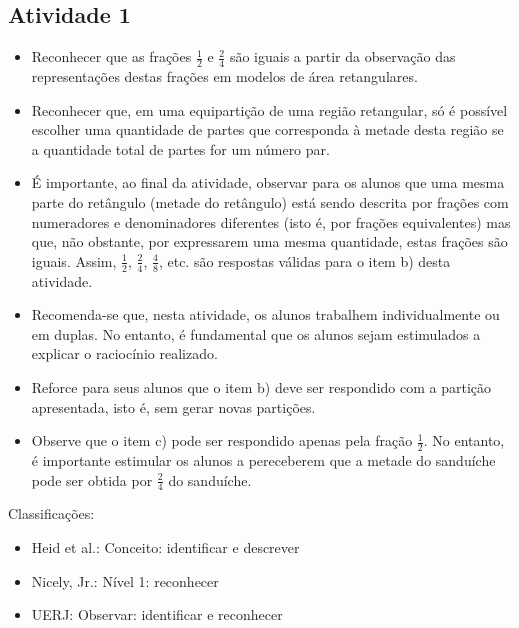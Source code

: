 \begin{multicols}{2}



\subsection{Atividade 1}

\begin{itemize} %
    \item       Reconhecer que as frações       $\frac{1}{2}$       e       
$\frac{2}{4}$       são iguais a partir da observação das representações destas 
frações em modelos de área retangulares.
    \item       Reconhecer que, em uma equipartição de uma região retangular, só 
é possível escolher uma quantidade de partes que corresponda à metade desta 
região se a quantidade total de partes for um número par.
    \item       É importante, ao final da atividade, observar para os alunos que 
uma mesma parte do retângulo (metade do retângulo) está sendo descrita por 
frações com numeradores e denominadores diferentes (isto é, por frações 
equivalentes) mas que, não obstante, por expressarem uma mesma quantidade, estas 
frações são iguais. Assim,       $\frac{1}{2}$,       $\frac{2}{4}$,       
$\frac{4}{8}$, etc. são respostas válidas para o item b) desta atividade.
\end{itemize} %
  
  
 
  
\begin{itemize} %
    \item       Recomenda-se que, nesta atividade, os alunos trabalhem 
individualmente ou em duplas. No entanto, é fundamental que os alunos sejam 
estimulados a explicar o raciocínio realizado.
    \item       Reforce para seus alunos que o item b) deve ser respondido com a 
partição apresentada, isto é, sem gerar novas partições.
    \item       Observe que o item c) pode ser respondido apenas pela fração     
  $\frac{1}{2}$. No entanto, é importante estimular os alunos a pereceberem que 
a metade do sanduíche pode ser obtida por       $\frac{2}{4}$       do 
sanduíche. 
\end{itemize} %
  
  
  Classificações:  
\begin{itemize} %
    \item       Heid et al.: Conceito: identificar e descrever
    \item       Nicely, Jr.: Nível 1: reconhecer
    \item       UERJ: Observar: identificar e reconhecer
\end{itemize} %
  


\end{multicols}
